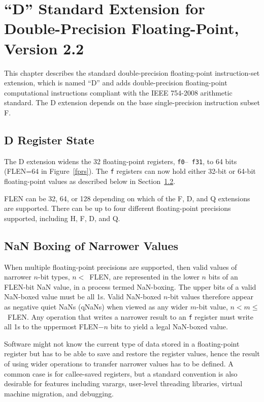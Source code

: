 \chapter{``D'' Standard Extension for Double-Precision Floating-Point,
Version 2.2}

This chapter describes the standard double-precision floating-point
instruction-set extension, which is named ``D'' and adds
double-precision floating-point computational instructions compliant
with the IEEE 754-2008 arithmetic standard.  The D extension depends on
the base single-precision instruction subset F.

\section{D Register State}

The D extension widens the 32 floating-point registers, {\tt f0}--{\tt
  f31}, to 64 bits (FLEN=64 in Figure~\ref{fprs}).  The {\tt f}
registers can now hold either 32-bit or 64-bit floating-point values
as described below in Section~\ref{nanboxing}.

\begin{commentary}
FLEN can be 32, 64, or 128 depending on which of the F, D, and Q
extensions are supported.  There can be up to four different
floating-point precisions supported, including H, F, D, and Q.
\end{commentary}

\section{NaN Boxing of Narrower Values}
\label{nanboxing}

When multiple floating-point precisions are supported, then valid
values of narrower $n$-bit types, \mbox{$n<$ FLEN}, are represented in
the lower $n$ bits of an FLEN-bit NaN value, in a process termed
NaN-boxing.  The upper bits of a valid NaN-boxed value must be all 1s.
Valid NaN-boxed $n$-bit values therefore appear as negative quiet NaNs
(qNaNs) when viewed as any wider $m$-bit value, \mbox{$n < m \leq$
  FLEN}.  Any operation that writes a narrower result to an {\tt f}
register must write all 1s to the uppermost FLEN$-n$ bits to yield a
legal NaN-boxed value.

\begin{samepage-commentary}
Software might not know the current type of data stored in a
floating-point register but has to be able to save and restore the
register values, hence the result of using wider operations to
transfer narrower values has to be defined.  A common case is for
callee-saved registers, but a standard convention is also desirable for
features including varargs, user-level threading libraries, virtual
machine migration, and debugging.
\end{samepage-commentary}

